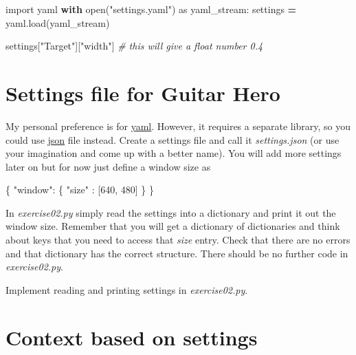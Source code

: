 \documentclass[
]{book}
\newenvironment{Shaded}{\begin{snugshade}}{\end{snugshade}}
\newcommand{\BuiltInTok}[1]{#1}
\newcommand{\CommentTok}[1]{\textcolor[rgb]{0.56,0.35,0.01}{\textit{#1}}}
\newcommand{\ControlFlowTok}[1]{\textcolor[rgb]{0.13,0.29,0.53}{\textbf{#1}}}
\newcommand{\DataTypeTok}[1]{\textcolor[rgb]{0.13,0.29,0.53}{#1}}
\newcommand{\DecValTok}[1]{\textcolor[rgb]{0.00,0.00,0.81}{#1}}
\newcommand{\FunctionTok}[1]{\textcolor[rgb]{0.00,0.00,0.00}{#1}}
\newcommand{\ImportTok}[1]{#1}
\newcommand{\NormalTok}[1]{#1}
\newcommand{\OperatorTok}[1]{\textcolor[rgb]{0.81,0.36,0.00}{\textbf{#1}}}
\newcommand{\OtherTok}[1]{\textcolor[rgb]{0.56,0.35,0.01}{#1}}
\newcommand{\StringTok}[1]{\textcolor[rgb]{0.31,0.60,0.02}{#1}}
\begin{document}
\begin{Shaded}
\begin{Highlighting}[]
\ImportTok{import}\NormalTok{ yaml}
\ControlFlowTok{with} \BuiltInTok{open}\NormalTok{(}\StringTok{"settings.yaml"}\NormalTok{) }\ImportTok{as}\NormalTok{ yaml\_stream:}
\NormalTok{    settings }\OperatorTok{=}\NormalTok{ yaml.load(yaml\_stream)}
    
\NormalTok{settings[}\StringTok{"Target"}\NormalTok{][}\StringTok{"width"}\NormalTok{] }\CommentTok{\# this will give a float number 0.4}
\end{Highlighting}
\end{Shaded}

\hypertarget{settings-file-for-guitar-hero}{%
\section{Settings file for Guitar Hero}\label{settings-file-for-guitar-hero}}

My personal preference is for \protect\hyperlink{yaml}{yaml}. However, it requires a separate library, so you could use \protect\hyperlink{json}{json} file instead. Create a settings file and call it \emph{settings.json} (or use your imagination and come up with a better name). You will add more settings later on but for now just define a window size as

\begin{Shaded}
\begin{Highlighting}[]
\FunctionTok{\{}
  \DataTypeTok{"window"}\FunctionTok{:} \FunctionTok{\{}
    \DataTypeTok{"size"} \FunctionTok{:} \OtherTok{[}\DecValTok{640}\OtherTok{,} \DecValTok{480}\OtherTok{]}
  \FunctionTok{\}}
\FunctionTok{\}}
\end{Highlighting}
\end{Shaded}

In \emph{exercise02.py} simply read the settings into a dictionary and print it out the window size. Remember that you will get a dictionary of dictionaries and think about keys that you need to access that \emph{size} entry. Check that there are no errors and that dictionary has the correct structure. There should be no further code in \emph{exercise02.py}.

Implement reading and printing settings in \emph{exercise02.py}.

\hypertarget{context-based-on-settings}{%
\section{Context based on settings}\label{context-based-on-settings}}
\end{document}
